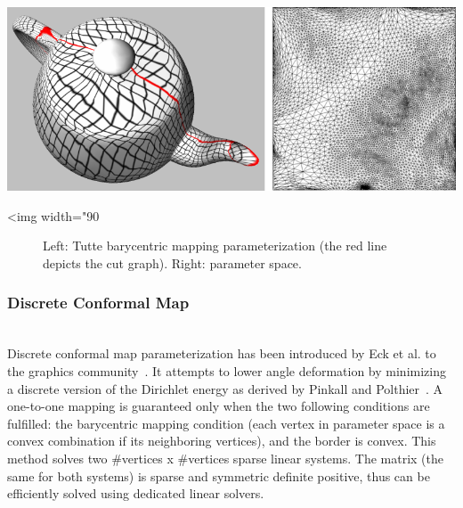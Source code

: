 \begin{center}
    \label{Surface_mesh_parameterization-fig-uniform}
    \begin{ccTexOnly}
      \includegraphics[width=1.0\textwidth]{Surface_mesh_parameterization/uniform}
    \end{ccTexOnly}
    \begin{ccHtmlOnly}
        <img width="90%
    \end{ccHtmlOnly}
    \begin{figure}[h]
        \caption{Left: Tutte barycentric mapping parameterization (the red
                 line depicts the cut graph). Right: parameter space.}
    \end{figure}
\end{center}


\subsubsection{Discrete Conformal Map}

  \\

Discrete conformal map parameterization has been introduced by Eck et
al. to the graphics community~\cite{cgal:eddhls-maam-95}. It attempts to
lower angle deformation by minimizing a discrete version of the
Dirichlet energy as derived by Pinkall and
Polthier~\cite{cgal:pp-cdmsc-93}. A one-to-one mapping is guaranteed
only when the two following conditions are fulfilled: the barycentric mapping condition (each vertex in parameter space is a convex combination if
its neighboring vertices), and the border is convex. This method solves two \#vertices x \#vertices sparse linear
systems. The matrix (the same for both systems) is sparse and symmetric definite
positive, thus can be efficiently solved using dedicated linear
solvers.

